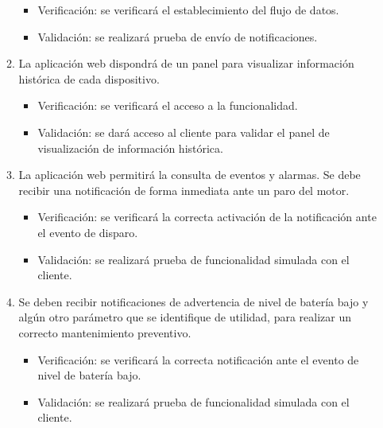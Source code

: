 \documentclass[
11pt, %
]{charter}
\begin{document}
\begin{enumerate}
\begin{enumerate}
			\begin{itemize}
				\item Verificación: se verificará el establecimiento del flujo de datos.
				\item Validación: se realizará prueba de envío de notificaciones.
			\end{itemize}
			\item La aplicación web dispondrá de un panel para visualizar información histórica de cada dispositivo.
			\begin{itemize}
				\item Verificación: se verificará el acceso a la funcionalidad.
				\item Validación: se dará acceso al cliente para validar el panel de visualización de información histórica. 
			\end{itemize}
			\item La aplicación web permitirá la consulta de eventos y alarmas. Se debe recibir una notificación de forma inmediata ante un paro del motor.
			\begin{itemize}
				\item Verificación: se verificará la correcta activación de la notificación ante el evento de disparo.
				\item Validación: se realizará prueba de funcionalidad simulada con el cliente.
			\end{itemize}
			\item Se deben recibir notificaciones de advertencia de nivel de batería bajo y algún otro parámetro que se identifique de utilidad, para realizar un correcto mantenimiento preventivo.
			\begin{itemize}
				\item Verificación: se verificará la correcta notificación ante el evento de nivel de batería bajo.
				\item Validación: se realizará prueba de funcionalidad simulada con el cliente.
			\end{itemize}
		\end{enumerate}


\end{enumerate}
\end{document}
